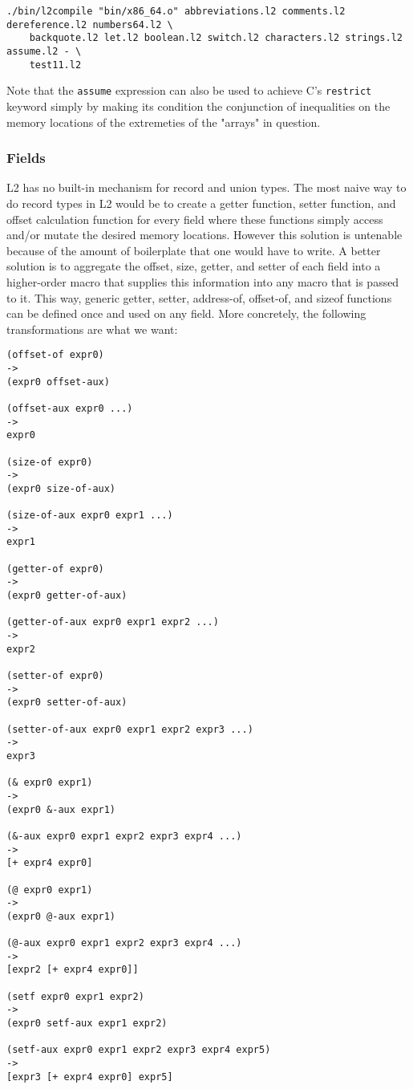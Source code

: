 \documentclass[]{article}
\begin{document}
\begin{verbatim}
./bin/l2compile "bin/x86_64.o" abbreviations.l2 comments.l2 dereference.l2 numbers64.l2 \
    backquote.l2 let.l2 boolean.l2 switch.l2 characters.l2 strings.l2 assume.l2 - \
    test11.l2
\end{verbatim}

Note that the \texttt{assume} expression can also be used to achieve C's
\texttt{restrict} keyword simply by making its condition the conjunction
of inequalities on the memory locations of the extremeties of the
"arrays" in question.

\hypertarget{fields}{%
\subsubsection{Fields}\label{fields}}

L2 has no built-in mechanism for record and union types. The most naive
way to do record types in L2 would be to create a getter function,
setter function, and offset calculation function for every field where
these functions simply access and/or mutate the desired memory
locations. However this solution is untenable because of the amount of
boilerplate that one would have to write. A better solution is to
aggregate the offset, size, getter, and setter of each field into a
higher-order macro that supplies this information into any macro that is
passed to it. This way, generic getter, setter, address-of, offset-of,
and sizeof functions can be defined once and used on any field. More
concretely, the following transformations are what we want:

\begin{verbatim}
(offset-of expr0)
->
(expr0 offset-aux)

(offset-aux expr0 ...)
->
expr0

(size-of expr0)
->
(expr0 size-of-aux)

(size-of-aux expr0 expr1 ...)
->
expr1

(getter-of expr0)
->
(expr0 getter-of-aux)

(getter-of-aux expr0 expr1 expr2 ...)
->
expr2

(setter-of expr0)
->
(expr0 setter-of-aux)

(setter-of-aux expr0 expr1 expr2 expr3 ...)
->
expr3

(& expr0 expr1)
->
(expr0 &-aux expr1)

(&-aux expr0 expr1 expr2 expr3 expr4 ...)
->
[+ expr4 expr0]

(@ expr0 expr1)
->
(expr0 @-aux expr1)

(@-aux expr0 expr1 expr2 expr3 expr4 ...)
->
[expr2 [+ expr4 expr0]]

(setf expr0 expr1 expr2)
->
(expr0 setf-aux expr1 expr2)

(setf-aux expr0 expr1 expr2 expr3 expr4 expr5)
->
[expr3 [+ expr4 expr0] expr5]
\end{verbatim}
\end{document}
